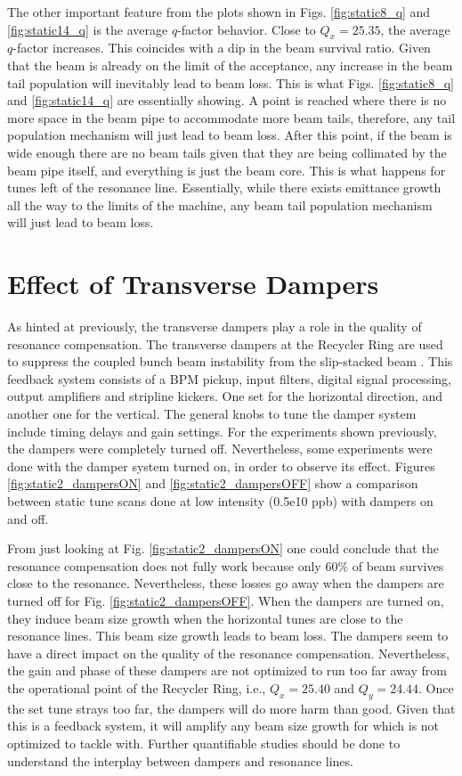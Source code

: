 The other important feature from the plots shown in Figs. \ref{fig:static8_q} and \ref{fig:static14_q} is the average $q$-factor behavior. Close to $Q_x=25.35$, the average $q$-factor increases. This coincides with a dip in the beam survival ratio. Given that the beam is already on the limit of the acceptance, any increase in the beam tail population will inevitably lead to beam loss. This is what Figs. \ref{fig:static8_q} and \ref{fig:static14_q} are essentially showing. A point is reached where there is no more space in the beam pipe to accommodate more beam tails, therefore, any tail population mechanism will just lead to beam loss. After this point, if the beam is wide enough there are no beam tails given that they are being collimated by the beam pipe itself, and everything is just the beam core. This is what happens for tunes left of the resonance line. Essentially, while there exists emittance growth all the way to the limits of the machine, any beam tail population mechanism will just lead to beam loss. 

\section{\label{sec:ch6dampers}Effect of Transverse Dampers}

As hinted at previously, the transverse dampers play a role in the quality of resonance compensation. The transverse dampers at the Recycler Ring are used to suppress the coupled bunch beam instability from the slip-stacked beam \cite{dampers1,dampers2}. This feedback system consists of a BPM pickup, input filters, digital signal processing, output amplifiers and stripline kickers. One set for the horizontal direction, and another one for the vertical. The general knobs to tune the damper system include timing delays and gain settings. For the experiments shown previously, the dampers were completely turned off. Nevertheless, some experiments were done with the damper system turned on, in order to observe its effect. Figures \ref{fig:static2_dampersON} and \ref{fig:static2_dampersOFF} show a comparison between static tune scans done at low intensity (0.5e10 ppb) with dampers on and off.

From just looking at Fig. \ref{fig:static2_dampersON} one could conclude that the resonance compensation does not fully work because only 60\% of beam survives close to the resonance. Nevertheless, these losses go away when the dampers are turned off for Fig. \ref{fig:static2_dampersOFF}. When the dampers are turned on, they induce beam size growth when the horizontal tunes are close to the resonance lines. This beam size growth leads to beam loss. The dampers seem to have a direct impact on the quality of the resonance compensation. Nevertheless, the gain and phase of these dampers are not optimized to run too far away from the operational point of the Recycler Ring, i.e., $Q_x = 25.40$ and $Q_y=24.44$. Once the set tune strays too far, the dampers will do more harm than good. Given that this is a feedback system, it will amplify any beam size growth for which is not optimized to tackle with. Further quantifiable studies should be done to understand the interplay between dampers and resonance lines.

